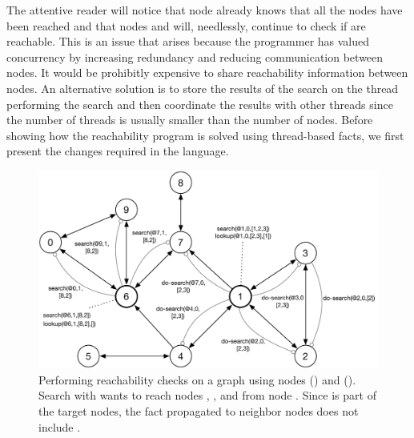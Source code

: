 The attentive reader will notice that node  already knows that all the
nodes have been reached and that nodes  and  will, needlessly,
continue to check if \code{[2,3]} are reachable. This is an issue that arises
because the programmer has valued concurrency by increasing redundancy and
reducing communication between nodes. It would be prohibitly expensive to share
reachability information between nodes. An alternative solution is to store the
results of the search on the thread performing the search and then coordinate
the results with other threads since the number of threads is usually smaller
than the number of nodes. Before showing how the reachability program is solved
using thread-based facts, we first present the changes required in the language.

\begin{figure}[ht]
\begin{center}
   \includegraphics[width=0.9\linewidth]{figures/threads/reach.pdf}
\end{center}
\caption{Performing reachability checks on a graph using nodes 
() and  (). Search with  wants
to reach nodes , , and  from node . Since
 is part of the target nodes, the fact 
propagated to neighbor nodes does not include .}
\label{fig:threads:reach_example}
\end{figure}

